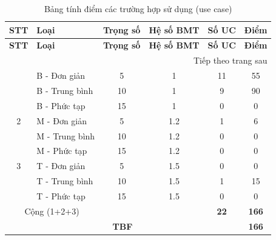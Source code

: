 \begin{longtable}{|c|p{4cm}|c|c|c|c|}
\caption{Bảng tính điểm các trường hợp sử dụng (use case) \label{tab:tbf}} \\
\hline
\textbf{STT} & \textbf{Loại} & \textbf{Trọng số} & \textbf{Hệ số BMT} & \textbf{Số UC} & \textbf{Điểm} \\ \hline
\endfirsthead
\hline
\textbf{STT} & \textbf{Loại} & \textbf{Trọng số} & \textbf{Hệ số BMT} & \textbf{Số UC} & \textbf{Điểm} \\ \hline
\endhead
\hline
\multicolumn{6}{r}{{Tiếp theo trang sau}} \\
\endfoot
\hline
\endlastfoot
1 & B - Đơn giản & 5 & 1 & 11 & 55 \\ \hline
  & B - Trung bình & 10 & 1 & 9 & 90 \\ \hline
  & B - Phức tạp & 15 & 1 & 0 & 0 \\ \hline
2 & M - Đơn giản & 5 & 1.2 & 1 & 6 \\ \hline
  & M - Trung bình & 10 & 1.2 & 0 & 0 \\ \hline
  & M - Phức tạp & 15 & 1.2 & 0 & 0 \\ \hline
3 & T - Đơn giản & 5 & 1.5 & 0 & 0 \\ \hline
  & T - Trung bình & 10 & 1.5 & 1 & 15 \\ \hline
  & T - Phức tạp & 15 & 1.5 & 0 & 0 \\ \hline
\multicolumn{2}{|c|}{Cộng (1+2+3)} & & & \textbf{22} & \textbf{166} \\ \hline
\multicolumn{5}{|c|}{\textbf{TBF}} & \textbf{166} \\ \hline
\end{longtable}
